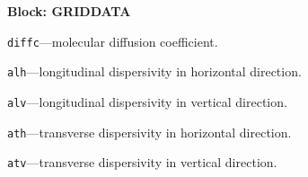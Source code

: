 
\item \textbf{Block: GRIDDATA}

\begin{description}
\item \texttt{diffc}---molecular diffusion coefficient.

\item \texttt{alh}---longitudinal dispersivity in horizontal direction.

\item \texttt{alv}---longitudinal dispersivity in vertical direction.

\item \texttt{ath}---transverse dispersivity in horizontal direction.

\item \texttt{atv}---transverse dispersivity in vertical direction.

\end{description}

